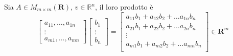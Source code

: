 \begin{definition}
	Sia $A \in M_{m \times m}(\mathbf{R})$, $v \in \mathbb{R}^n$, il loro prodotto è
	\begin{equation*}
		\begin{bmatrix}
			a_{11}, \ldots, a_{1n} \\
			\vdots \\
			a_{m1}, \ldots, a_{mn}
		\end{bmatrix}
		\begin{bmatrix}
			b_1 \\
			\vdots \\
			b_n
		\end{bmatrix}
		=
		\begin{bmatrix}
			a_{11}b_{1} + a_{12}b_{2} + \ldots a_{1n}b_n\\
			a_{21}b_{1} + a_{22}b_{2} + \ldots a_{2n}b_n\\
			\vdots \\
			a_{m1}b_{1} + a_{m2}b_{2} + \ldots a_{mn}b_n\\
		\end{bmatrix} \in \mathbf{R}^m
	\end{equation*}
\end{definition}
